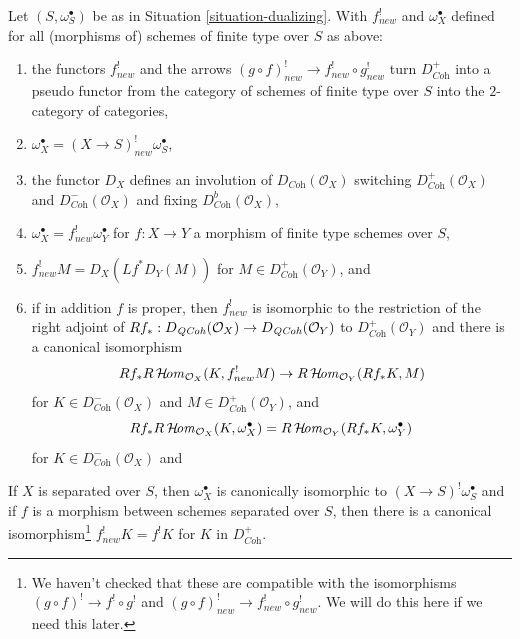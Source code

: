 \begin{lemma}
\label{lemma-duality-bootstrap}
Let $(S, \omega_S^\bullet)$ be as in Situation \ref{situation-dualizing}.
With $f^!_{new}$ and $\omega_X^\bullet$ defined for all (morphisms of)
schemes of finite type over $S$ as above:
\begin{enumerate}
\item the functors $f^!_{new}$ and the arrows
$(g \circ f)^!_{new} \to f^!_{new} \circ g^!_{new}$
turn $D_{\textit{Coh}}^+$ into a pseudo functor from the category of
schemes of finite type over $S$ into the $2$-category of categories,
\item $\omega_X^\bullet = (X \to S)^!_{new} \omega_S^\bullet$,
\item the functor $D_X$
defines an involution of $D_{\textit{Coh}}(\mathcal{O}_X)$
switching $D_{\textit{Coh}}^+(\mathcal{O}_X)$ and
$D_{\textit{Coh}}^-(\mathcal{O}_X)$ and fixing
$D_{\textit{Coh}}^b(\mathcal{O}_X)$,
\item $\omega_X^\bullet = f^!_{new}\omega_Y^\bullet$ for
$f : X \to Y$ a morphism of finite type schemes over $S$,
\item $f^!_{new}M = D_X(Lf^*D_Y(M))$ for
$M \in D_{\textit{Coh}}^+(\mathcal{O}_Y)$, and
\item if in addition $f$ is proper, then $f^!_{new}$ is isomorphic
to the restriction of the right adjoint of
$Rf_* : D_{\mathit{QCoh}}(\mathcal{O}_X) \to D_{\mathit{QCoh}}(\mathcal{O}_Y)$ to
$D_{\textit{Coh}}^+(\mathcal{O}_Y)$ and there is a canonical isomorphism
$$
Rf_*R\mathop{\mathcal{H}\!\mathit{om}}\nolimits_{\mathcal{O}_X}(K, f^!_{new}M)
\to
R\mathop{\mathcal{H}\!\mathit{om}}\nolimits_{\mathcal{O}_Y}(Rf_*K, M)
$$
for $K \in D^-_{\textit{Coh}}(\mathcal{O}_X)$ and
$M \in D_{\textit{Coh}}^+(\mathcal{O}_Y)$, and
$$
Rf_*R\mathop{\mathcal{H}\!\mathit{om}}\nolimits_{\mathcal{O}_X}(K, \omega_X^\bullet) =
R\mathop{\mathcal{H}\!\mathit{om}}\nolimits_{\mathcal{O}_Y}(Rf_*K, \omega_Y^\bullet)
$$
for $K \in D^-_{\textit{Coh}}(\mathcal{O}_X)$ and
\end{enumerate}
If $X$ is separated over $S$, then
$\omega_X^\bullet$ is canonically isomorphic to
$(X \to S)^!\omega_S^\bullet$ and
if $f$ is a morphism between schemes separated
over $S$, then there is a canonical isomorphism\footnote{We haven't
checked that these are compatible with the isomorphisms
$(g \circ f)^! \to f^! \circ g^!$ and
$(g \circ f)^!_{new} \to f^!_{new} \circ g^!_{new}$. We will do this
here if we need this later.}
$f_{new}^!K = f^!K$ for $K$ in $D_{\textit{Coh}}^+$.
\end{lemma}

